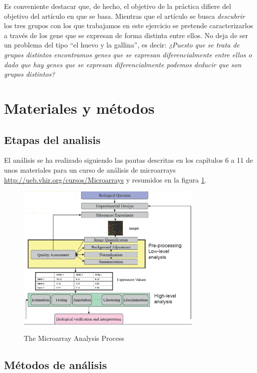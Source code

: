\documentclass[a4paper]{article}\usepackage[]{graphicx}\usepackage[]{color}
\begin{document}
Es conveniente destacar que, de hecho, el objetivo de la práctica difiere del objetivo del artículo en que se basa. Mientras que el artículo se busca  \emph{descubrir} los tres grupos con los que trabajamos en este ejercicio se pretende caracterizarlos a través de los gene que se expresan de forma distinta entre ellos. No deja de ser un problema del tipo ``el huevo y la gallina'', es decir: \emph{¿Puesto que se trata de grupos distintos encontramos genes que se expresan diferencialmente entre ellos o dado que hay genes que se expresan diferencialmente podemos deducir que son grupos distintos?}

\section{Materiales y métodos}

\subsection{Etapas del analisis}

El análisis se ha realizado siguiendo las pautas descritas en los capítulos 6 a 11 de unos materiales para un curso de análisis de microarrays \url{http://ueb.vhir.org/cursos/Microarrays} y resumidos en la figura \ref{fig:pipeline}.

\begin{figure}[htbp]\begin{center}
\includegraphics[width=9cm]{images/analysisProcess}\\
\caption{The Microarray Analysis Process}\label{fig:pipeline}
\end{center}
\end{figure}

\subsection{Métodos de análisis}
\end{document}
